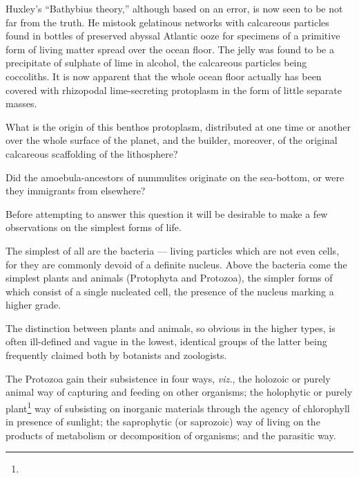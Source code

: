 \documentclass[a4paper, 12pt, oneside]{article}
\begin{document}
Huxley's ``Bathybius theory,'' although based on an error, is now seen to be not far from the truth. He mistook gelatinous networks with calcareous particles found in bottles of preserved abyssal Atlantic ooze for specimens of a primitive form of living matter spread over the ocean floor. The jelly was found to be a precipitate of sulphate of lime in alcohol, the calcareous particles being coccoliths. It is now apparent that the whole ocean floor actually has been covered with rhizopodal lime-secreting protoplasm in the form of little separate masses.

What is the origin of this benthos protoplasm, distributed at one time or another over the whole surface of the planet, and the builder, moreover, of the original calcareous scaffolding of the lithosphere?

Did the amoebula-ancestors of nummulites originate on the sea-bottom, or were they immigrants from elsewhere?

Before attempting to answer this question it will be desirable to make a few observations on the simplest forms of life.

The simplest of all are the bacteria --- living particles which are not even cells, for they are commonly devoid of a definite nucleus. Above the bacteria come the simplest plants and animals (Protophyta and Protozoa), the simpler forms of which consist of a single nucleated cell, the presence of the nucleus marking a higher grade.

The distinction between plants and animals, so obvious in the higher types, is often ill-defined and vague in the lowest, identical groups of the latter being frequently claimed both by botanists and zoologists.

The Protozoa gain their subsistence in four ways, \emph{viz.}, the holozoic or purely animal way of capturing and feeding on other organisms; the holophytic or purely plant\footnote{} way of subsisting on inorganic materials through the agency of chlorophyll in presence of sunlight; the saprophytic (or saprozoic) way of living on the products of metabolism or decomposition of organisms; and the parasitic way.
\end{document}
